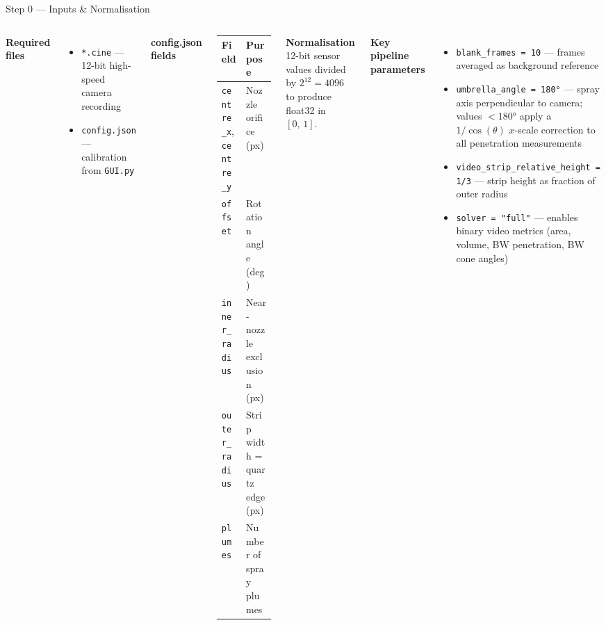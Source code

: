 \documentclass[aspectratio=169,10pt]{beamer}
\begin{document}
\begin{frame}{Step 0 — Inputs \& Normalisation}
  \begin{columns}
      \textbf{Required files}
      \begin{itemize}
        \item \texttt{*.cine} — 12-bit high-speed camera recording
        \item \texttt{config.json} — calibration from \texttt{GUI.py}
      \end{itemize}

      \medskip
      \textbf{config.json fields}
      \begin{center}\small
      \begin{tabular}{ll}
        \toprule
        Field & Purpose \\
        \midrule
        \texttt{centre\_x}, \texttt{centre\_y} & Nozzle orifice (px) \\
        \texttt{offset}                         & Rotation angle (deg) \\
        \texttt{inner\_radius}                  & Near-nozzle exclusion (px) \\
        \texttt{outer\_radius}                  & Strip width = quartz edge (px) \\
        \texttt{plumes}                         & Number of spray plumes \\
        \bottomrule
      \end{tabular}
      \end{center}

      \medskip
      \textbf{Normalisation}\\
      12-bit sensor values divided by $2^{12} = 4096$ to produce float32 in $[0,\,1]$.

      \textbf{Key pipeline parameters}
      \begin{itemize}\setlength\itemsep{3pt}
        \item \texttt{blank\_frames = 10} — frames averaged as background reference
        \item \texttt{umbrella\_angle = 180°} — spray axis perpendicular to camera; values $<180°$ apply a $1/\cos(\theta)$ $x$-scale correction to all penetration measurements
        \item \texttt{video\_strip\_relative\_height = 1/3} — strip height as fraction of outer radius
        \item \texttt{solver = "full"} — enables binary video metrics (area, volume, BW penetration, BW cone angles)
      \end{itemize}
  \end{columns}
\end{frame}
\end{document}

